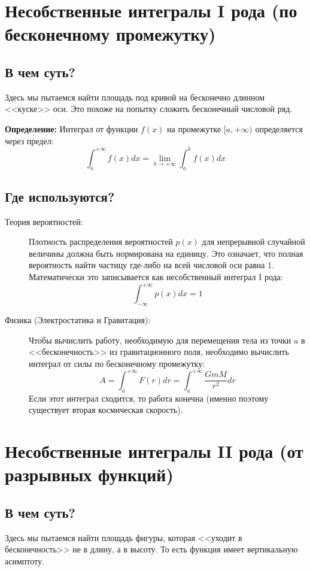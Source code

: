 \documentclass[a4paper, 12pt]{report}
\numberwithin{equation}{section}
\begin{document}
\section{Несобственные интегралы I рода (по бесконечному промежутку)}
\subsection{В чем суть?}
Здесь мы пытаемся найти площадь под кривой на бесконечно длинном <<куске>> оси. Это похоже на попытку сложить бесконечный числовой ряд.

\textbf{Определение:} Интеграл от функции $f(x)$ на промежутке $[a, +\infty)$ определяется через предел:
\begin{equation*}
	\int_{a}^{+\infty} f(x) dx = \lim_{b \to +\infty} \int_{a}^{b} f(x) dx
\end{equation*}

\subsection{Где используются?}
\begin{description}
	\item[Теория вероятностей:] Плотность распределения вероятностей $p(x)$ для непрерывной случайной величины должна быть нормирована на единицу. Это означает, что полная вероятность найти частицу где-либо на всей числовой оси равна 1. Математически это записывается как несобственный интеграл I рода:
	$$ \int_{-\infty}^{+\infty} p(x) dx = 1 $$
	
	\item[Физика (Электростатика и Гравитация):] Чтобы вычислить работу, необходимую для перемещения тела из точки $a$ в <<бесконечность>> из гравитационного поля, необходимо вычислить интеграл от силы по бесконечному промежутку:
	$$ A = \int_{a}^{+\infty} F(r) dr = \int_{a}^{+\infty} \frac{GmM}{r^2} dr $$
	Если этот интеграл сходится, то работа конечна (именно поэтому существует вторая космическая скорость).
\end{description}

\section{Несобственные интегралы II рода (от разрывных функций)}
\subsection{В чем суть?}
Здесь мы пытаемся найти площадь фигуры, которая <<уходит в бесконечность>> не в длину, а в высоту. То есть функция имеет вертикальную асимптоту.
\end{document}
